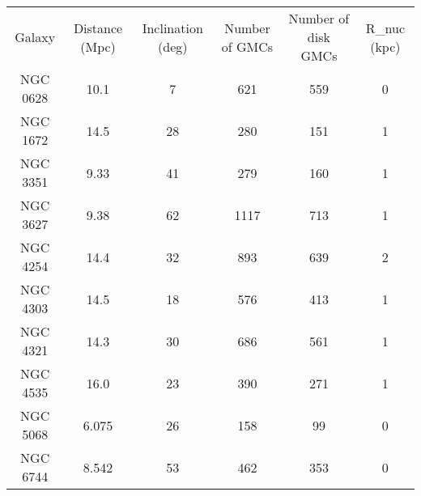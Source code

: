 \begin{table}
\begin{tabular}{cccccc}
Galaxy & Distance (Mpc) & Inclination (deg) & Number of GMCs & Number of disk GMCs & R_{nuc} (kpc) \\
NGC 0628 & 10.1 & 7 & 621 & 559 & 0 \\
NGC 1672 & 14.5 & 28 & 280 & 151 & 1 \\
NGC 3351 & 9.33 & 41 & 279 & 160 & 1 \\
NGC 3627 & 9.38 & 62 & 1117 & 713 & 1 \\
NGC 4254 & 14.4 & 32 & 893 & 639 & 2 \\
NGC 4303 & 14.5 & 18 & 576 & 413 & 1 \\
NGC 4321 & 14.3 & 30 & 686 & 561 & 1 \\
NGC 4535 & 16.0 & 23 & 390 & 271 & 1 \\
NGC 5068 & 6.075 & 26 & 158 & 99 & 0 \\
NGC 6744 & 8.542 & 53 & 462 & 353 & 0 \\
\end{tabular}
\end{table}
